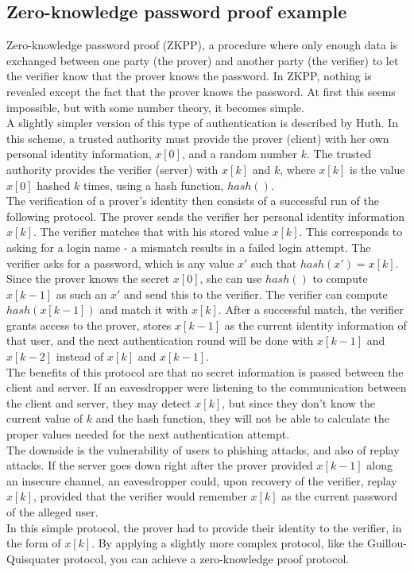 \documentclass[11pt]{article}
\begin{document}
\subsection{Zero-knowledge password proof example} 
Zero-knowledge password proof (ZKPP)\cite{huth}, a procedure where only enough data is exchanged between one party (the prover) and another party (the verifier) to let the verifier know that the prover knows the password.  In ZKPP, nothing is revealed except the fact that the prover knows the password.  At first this seems impossible, but with some number theory, it becomes simple\cite{gqprotocol}.\\
A slightly simpler version of this type of authentication is described by Huth\cite{huth}. In this scheme, a trusted authority must provide the prover (client) with her own personal identity information, $x[0]$, and a random number $k$.  The trusted authority provides the verifier (server) with $x[k]$ and $k$, where $x[k]$ is the value $x[0]$ hashed $k$ times, using a hash function, $hash()$.\\
	The verification of a prover's identity then consists of a successful run of the following protocol.  The prover sends the verifier her personal identity information $x[k]$.  The verifier matches that with his stored value $x[k]$.  This corresponds to asking for a login name - a mismatch results in a failed login attempt.  The verifier asks for a password, which is any value $x\prime$ such that $hash(x\prime)=x[k]$. Since the prover knows the secret $x[0]$, she can use $hash()$ to compute $x[k-1]$ as such an $x\prime$ and send this to the verifier.  The verifier can compute $hash(x[k-1])$ and match it with $x[k]$.  After a successful match, the verifier grants access to the prover, stores $x[k-1]$ as the current identity information of that user, and the next authentication round will be done with $x[k-1]$ and $x[k-2]$ instead of $x[k]$ and $x[k-1]$.\\
	The benefits of this protocol are that no secret information is passed between the client and server.  If an eavesdropper were listening to the communication between the client and server, they may detect $x[k]$, but since they don't know the current value of $k$ and the hash function, they will not be able to calculate the proper values needed for the next authentication attempt.\\
	The downside is the vulnerability of users to phishing attacks, and also of replay attacks.  If the server goes down right after the prover provided $x[k-1]$ along an insecure channel, an eavesdropper could, upon recovery of the verifier, replay $x[k]$, provided that the verifier would remember $x[k]$ as the current password of the alleged user.\\
In this simple protocol, the prover had to provide their identity to the verifier, in the form of $x[k]$. By applying a slightly more complex protocol, like the Guillou-Quisquater protocol\cite{gqprotocol}, you can achieve a zero-knowledge proof protocol.
\end{document}
